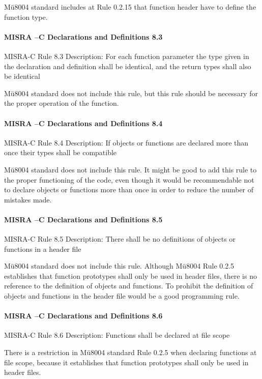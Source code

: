 Mü8004 standard includes at Rule 0.2.15 that function header have to define the function type.

\paragraph{MISRA –C Declarations and Definitions 8.3}
MISRA-C Rule 8.3 Description: For each function parameter the type given in the declaration and definition shall be identical, and the return types shall also be identical

Mü8004 standard does not include this rule, but this rule should be necessary for the proper operation of the function. 

\paragraph{MISRA –C Declarations and Definitions 8.4}
MISRA-C Rule 8.4 Description: If objects or functions are declared more than once their types shall be compatible

Mü8004 standard does not include this rule. It might be good to add this rule to the proper functioning of the code, even though it would be recommendable not to declare objects or functions more than once in order to reduce the number of mistakes made.

\paragraph{MISRA –C Declarations and Definitions 8.5}
MISRA-C Rule 8.5 Description: There shall be no definitions of objects or functions in a header file

Mü8004 standard does not include this rule.  Although Mü8004 Rule 0.2.5 establishes that function prototypes shall only be used in header files, there is no reference to the definition of objects and functions. To prohibit the definition of objects and functions in the header file would be a good programming rule.

\paragraph{MISRA –C Declarations and Definitions 8.6}
MISRA-C Rule 8.6 Description: Functions shall be declared at file scope

There is a restriction in Mü8004 standard Rule 0.2.5 when declaring functions at file scope, because it establishes that function prototypes shall only be used in header files.

